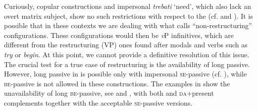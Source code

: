 \documentclass[output=paper,modfonts,newtxmath,hidelinks,]{langscibook}
\begin{document}
\ea \label{7:ex15}
	\z
\z

\noindent Curiously, copular constructions and impersonal \textit{trebati} `need', which also lack an overt matrix subject, show no such restrictions with respect to the  (cf.  and ). It is possible that in these contexts we are dealing with what \citet{Wurmbrand2003} calls “non-restructuring” configurations. These configurations would then be \textit{v}P infinitives, which are different from the restructuring (VP) ones found after modals and verbs such as \textit{try} or \textit{begin}. At this point, we cannot provide a definitive resolution of this issue. The crucial test for a true case of restructuring is the availability of long passive. However, long passive in  is possible only with impersonal \textsc{se}-passive (cf. \citealt{TodorovicWurmbrand2015}), while \textsc{be}-passive is not allowed in these constructions. The examples in  show the unavailability of long \textsc{be-}passive, see  and , with both  and \textsc{da}+present complements together with the acceptable \textsc{se-}passive versions.
\end{document}
